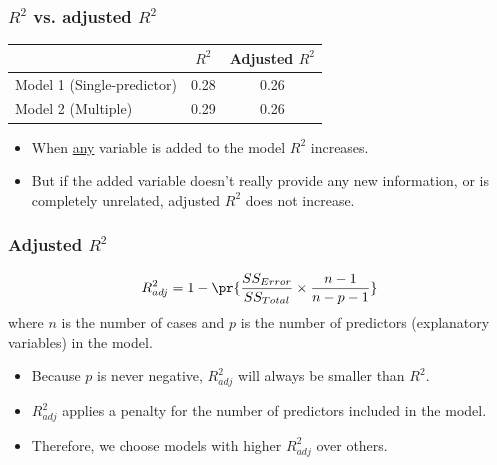 %
%
%
%
%
%
%

\begin{frame}[fragile]
\frametitle{$R^2$ vs. adjusted $R^2$}

\renewcommand\arraystretch{1.25}
\begin{center}
\begin{tabular}{l | c  c}
			& $R^2$	& Adjusted $R^2$ \\
\hline
Model 1 (Single-predictor)	& 0.28	& 0.26 \\
Model 2 (Multiple)			& 0.29	& 0.26 	
\end{tabular}
\end{center}

\pause

\begin{itemize}

\item When \underline{any} variable is added to the model $R^2$ increases.

\pause

\item But if the added variable doesn't really provide any new information, or is completely unrelated, adjusted $R^2$ does not increase.

\end{itemize}



\end{frame}


\begin{frame}
\frametitle{Adjusted $R^2$}

{\[ R^2_{adj} = 1 - \pr{ \frac{ SS_{Error} }{ SS_{Total} } \times \frac{n - 1}{n - p - 1} } \]
where $n$ is the number of cases and $p$ is the number of predictors (explanatory variables) in the model.
}

\begin{itemize}

\item Because $p$ is never negative, $R^2_{adj}$ will always be smaller than $R^2$.

\item $R^2_{adj}$ applies a penalty for the number of predictors included in the model.

\item Therefore, we choose models with higher $R^2_{adj}$ over others.

\end{itemize}

\end{frame}

